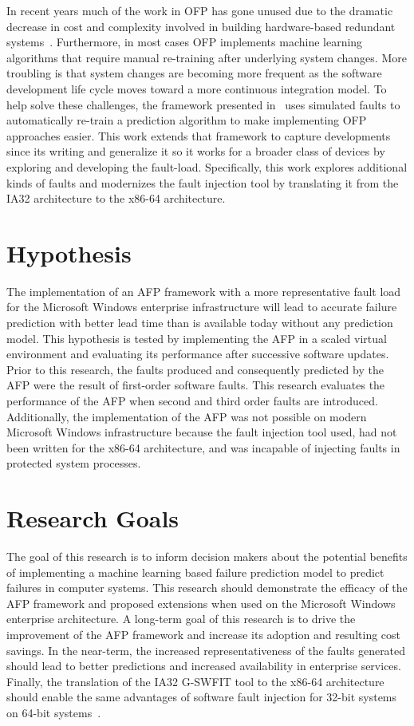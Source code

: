 In recent years much of the work in OFP has gone unused due to the dramatic
decrease in cost and complexity involved in building hardware-based redundant
systems~\cite{irrera2015}.  Furthermore, in most cases OFP implements machine
learning algorithms that require manual re-training after underlying system
changes.  More troubling is that system changes are becoming more frequent as
the software development life cycle moves toward a more continuous integration
model.  To help solve these challenges, the framework presented
in~\cite{irrera2015} uses simulated faults to automatically re-train a
prediction algorithm to make implementing OFP approaches easier.  This work
extends that framework to capture developments since its writing and generalize
it so it works for a broader class of devices by exploring and developing the
fault-load.  Specifically, this work explores additional kinds of faults and
modernizes the fault injection tool by translating it from the IA32
architecture to the x86-64 architecture.

\section{Hypothesis}
The implementation of an AFP framework with a more representative fault load
for the Microsoft Windows enterprise infrastructure will lead to accurate
failure prediction with better lead time than is available today without any
prediction model.  This hypothesis is tested by implementing the AFP in a
scaled virtual environment and evaluating its performance after successive
software updates.  Prior to this research, the faults produced and consequently
predicted by the AFP were the result of first-order software faults.  This
research evaluates the performance of the AFP when second and third order
faults are introduced.  Additionally, the implementation of the AFP was not
possible on modern Microsoft Windows infrastructure because the fault injection
tool used, had not been written for the x86-64 architecture, and was incapable
of injecting faults in protected system processes.

\section{Research Goals}
The goal of this research is to inform decision makers about the potential
benefits of implementing a machine learning based failure prediction model to
predict failures in computer systems.  This research should demonstrate the
efficacy of the AFP framework and proposed extensions when used on the
Microsoft Windows enterprise architecture.  A long-term goal of this research
is to drive the improvement of the AFP framework and increase its adoption and
resulting cost savings.  In the near-term, the increased representativeness of
the faults generated should lead to better predictions and increased
availability in enterprise services.  Finally, the translation of the IA32
G-SWFIT tool to the x86-64 architecture should enable the same advantages of
software fault injection for 32-bit systems on 64-bit systems~\cite{gswfit}.

